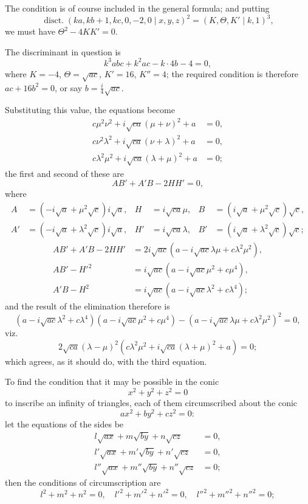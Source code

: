 \documentclass[11pt,a4paper]{book}
\begin{document}
The condition is of course included in the general formula; and putting
\[
\operatorname{disct.} (ka, kb+1, kc, 0, -2, 0 \mid x,y,z)^2 = (K, \Theta, K' \mid k, 1)^3,
\]
we must have $\Theta^2 - 4KK' = 0$.

The discriminant in question is
\[
k^3 abc + k^2 ac - k \cdot 4b - 4 = 0,
\]
where $K = -4$, $\Theta = \sqrt{ac}$, $K' = 16$, $K'' = 4$; the required condition is therefore $ac + 16b^2 = 0$, or say $b = \frac{i}{4}\sqrt{ac}$.

Substituting this value, the equations become
\begin{align*}
c\mu^2\nu^2 + i\sqrt{ca}(\mu+\nu)^2 + a &= 0, \\
c\nu^2\lambda^2 + i\sqrt{ca}(\nu+\lambda)^2 + a &= 0, \\
c\lambda^2\mu^2 + i\sqrt{ca}(\lambda+\mu)^2 + a &= 0;
\end{align*}
the first and second of these are
\[
AB' + A'B - 2HH' = 0,
\]
where
\begin{align*}
A &= (-i\sqrt{a} + \mu^2\sqrt{c})i\sqrt{a}, & H &= i\sqrt{ca}\mu, & B &= (i\sqrt{a} + \mu^2\sqrt{c})\sqrt{c}, \\
A' &= (-i\sqrt{a} + \lambda^2\sqrt{c})i\sqrt{a}, & H' &= i\sqrt{ca}\lambda, & B' &= (i\sqrt{a} + \lambda^2\sqrt{c})\sqrt{c};
\end{align*}
\begin{align*}
AB' + A'B - 2HH' &= 2i\sqrt{ac}(a - i\sqrt{ac}\lambda\mu + c\lambda^2\mu^2), \\
AB' - H'^2 &= i\sqrt{ac}(a - i\sqrt{ac}\mu^2 + c\mu^4), \\
A'B - H^2 &= i\sqrt{ac}(a - i\sqrt{ac}\lambda^2 + c\lambda^4);
\end{align*}
and the result of the elimination therefore is
\[
(a - i\sqrt{ac}\lambda^2 + c\lambda^4)(a - i\sqrt{ac}\mu^2 + c\mu^4) - (a - i\sqrt{ac}\lambda\mu + c\lambda^2\mu^2)^2 = 0,
\]
viz.
\[
2\sqrt{ca}(\lambda - \mu)^2(c\lambda^2\mu^2 + i\sqrt{ca}(\lambda+\mu)^2 + a) = 0;
\]
which agrees, as it should do, with the third equation.

To find the condition that it may be possible in the conic
\[
x^2 + y^2 + z^2 = 0
\]
to inscribe an infinity of triangles, each of them circumscribed about the conic
\[
ax^2 + by^2 + cz^2 = 0:
\]
let the equations of the sides be
\begin{align*}
l\sqrt{ax} + m\sqrt{by} + n\sqrt{cz} &= 0, \\
l'\sqrt{ax} + m'\sqrt{by} + n'\sqrt{cz} &= 0, \\
l''\sqrt{ax} + m''\sqrt{by} + n''\sqrt{cz} &= 0;
\end{align*}
then the conditions of circumscription are
\[
l^2 + m^2 + n^2 = 0, \quad l'^2 + m'^2 + n'^2 = 0, \quad l''^2 + m''^2 + n''^2 = 0;
\]
\end{document}
